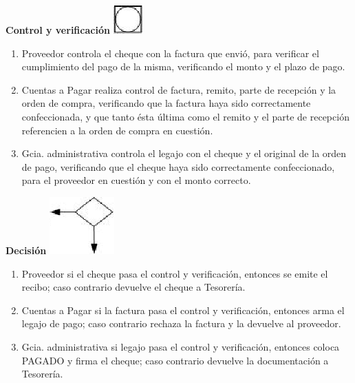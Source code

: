 \begin{center}
  \textbf{Control y verificación}
  \includegraphics{./Images/Simbolos/simbolo-Control-y-Verificacion.png}
\end{center}
\begin{enumerate}
  \item Proveedor controla el cheque con la factura que envió, para verificar el cumplimiento del pago de la misma, verificando el monto y el plazo de pago.
  \item Cuentas a Pagar realiza control de factura, remito, parte de recepción y la orden de compra, verificando que la factura haya sido correctamente confeccionada, y que tanto ésta última como el remito y el parte de recepción referencien a la orden de compra en cuestión. 
  \item Gcia. administrativa controla el legajo con el cheque y el original de la orden de pago, verificando que el cheque haya sido correctamente confeccionado, para el proveedor en cuestión y con el monto correcto.
\end{enumerate}

\begin{center}
  \textbf{Decisión}
  \includegraphics{./Images/Simbolos/simbolo-Decision.png}
\end{center}
\begin{enumerate}
  \item Proveedor si el cheque pasa el control y verificaci\'on, entonces se emite el recibo; caso contrario devuelve el cheque a Tesorería.
  \item Cuentas a Pagar si la factura pasa el control y verificaci\'on, entonces arma el legajo de pago; caso contrario rechaza la factura y la devuelve al proveedor.
  \item Gcia. administrativa si legajo pasa el control y verificaci\'on, entonces coloca PAGADO y firma el cheque; caso contrario devuelve la documentación a Tesorería.
\end{enumerate}

